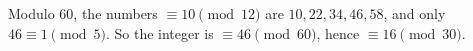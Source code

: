 Modulo $60$, the numbers $\equiv10\pmod{12}$ are $10,22,34,46,58$, and only $46\equiv1\pmod5$. So the integer is $\equiv46\pmod{60}$, hence $\equiv\boxed{16}\pmod{30}$.
